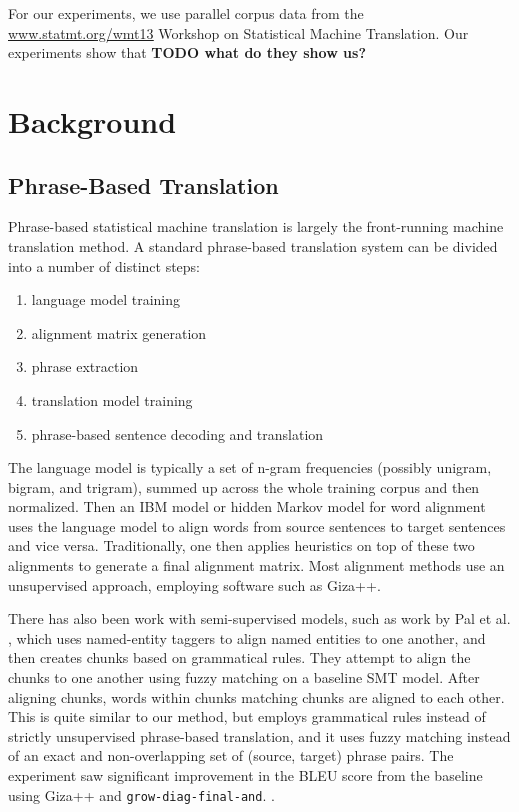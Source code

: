 \documentclass[twocolumn]{article}
\newcommand{\linespacing}{
  \onehalfspacing
}
\newcommand{\originalAlign}{\texttt{grow-diag-final-and}}
\newcommand{\wrapSingleSpacing}[1]{
  \singlespacing
  #1
  \linespacing{}
}
\begin{document}
For our experiments, we use parallel corpus data from the
\href{http://www.statmt.org/wmt13/training-parallel-nc-v8.tgz}
     {\underline{www.statmt.org/wmt13}}
Workshop on Statistical Machine Translation.
Our experiments show that \textbf{TODO what do they show us?}


\section{Background}
\subsection{Phrase-Based Translation}
Phrase-based statistical machine translation is largely the front-running
machine translation method. A standard phrase-based translation system can be
divided into a number of distinct steps:
\wrapSingleSpacing{
\begin{enumerate}
    \item language model training
    \item alignment matrix generation
    \item phrase extraction
    \item translation model training
    \item phrase-based sentence decoding and translation
\end{enumerate}
}
The language model is typically a set of n-gram frequencies (possibly unigram,
bigram, and trigram), summed up across the whole training corpus and then
normalized. Then an IBM model or hidden Markov model for word alignment uses the
language model to align words from source sentences to target sentences and vice
versa. Traditionally, one then applies heuristics on top of these two alignments
to generate a final alignment matrix.
Most alignment methods use an unsupervised approach, employing software such as
Giza++.

There has also been work with semi-supervised models, such as work by
Pal et al. \cite{pnb2013}, which uses named-entity taggers to align named
entities to one another, and then creates chunks based on grammatical
rules. They attempt to align the chunks to one another using fuzzy matching on a
baseline SMT model. After aligning chunks, words within chunks matching chunks
are aligned to each other. This is quite similar to our method, but employs
grammatical rules instead of strictly unsupervised phrase-based translation, and
it uses fuzzy matching instead of an exact and non-overlapping set of
(source, target) phrase pairs. The experiment saw significant improvement in
the BLEU score from the baseline using Giza++ and
\originalAlign{}. \cite{pnb2013}.
\end{document}
